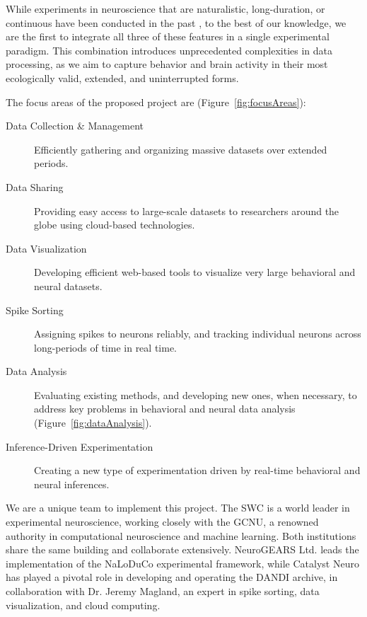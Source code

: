 While experiments in neuroscience that are naturalistic, long-duration, or
continuous have been conducted in the past
\citep[e.g.,][]{jhuangEtAl10,maoEtAl21,volohEtAl23}, to the best of our
knowledge, we are the first to integrate all three of these features in a
single experimental paradigm.
%
This combination introduces unprecedented complexities in data processing, as
we aim to capture behavior and brain activity in their most ecologically valid,
extended, and uninterrupted forms.

The focus areas of the proposed project are (Figure~\ref{fig:focusAreas}):

\begin{description}

    \item[Data Collection \& Management] Efficiently gathering and organizing
        massive datasets over extended periods.

    \item[Data Sharing] Providing easy access to large-scale datasets
        to researchers around the globe using cloud-based technologies.

    \item[Data Visualization] Developing efficient web-based tools to visualize
        very large behavioral and neural datasets.

    \item[Spike Sorting] Assigning spikes to neurons reliably, and tracking
        individual neurons across long-periods of time in real time.

    \item[Data Analysis] Evaluating existing methods, and developing new ones,
        when necessary, to address key problems in behavioral and neural data
        analysis (Figure~\ref{fig:dataAnalysis}).

    \item[Inference-Driven Experimentation] Creating a new type of
        experimentation driven by real-time behavioral and neural inferences.

\end{description}

We are a unique team to implement this project.
%
The SWC is a world leader in experimental neuroscience, working closely with
the GCNU, a renowned authority in computational neuroscience and machine
learning. Both institutions share the same building and collaborate
extensively.
%
NeuroGEARS Ltd. leads the implementation of the NaLoDuCo experimental
framework,
%
while Catalyst Neuro has played a pivotal role in developing and operating the
DANDI archive,
%
in collaboration with Dr. Jeremy Magland, an expert in spike sorting, data
visualization, and cloud computing.


